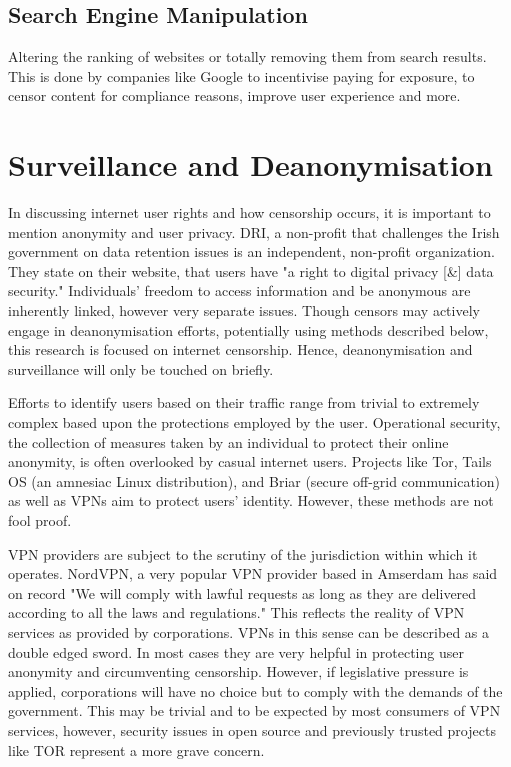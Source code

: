 \subsection{Search Engine Manipulation}

Altering the ranking of websites or totally removing them from search results. This is done by companies like Google to incentivise paying for exposure, to censor content for compliance reasons, improve user experience and more. 


\section{Surveillance and Deanonymisation}

In discussing internet user rights and how censorship occurs, it is important to mention anonymity and user privacy. DRI, a non-profit that challenges the Irish government on data retention issues is an independent, non-profit organization. They state on their website, that users have "a right to digital privacy [\&] data security." \cite{digital_rights_ireland} Individuals' freedom to access information and be anonymous are inherently linked, however very separate issues. Though censors may actively engage in deanonymisation efforts, potentially using methods described below, this research is focused on internet censorship. Hence, deanonymisation and surveillance will only be touched on briefly.

Efforts to identify users based on their traffic range from trivial to extremely complex based upon the protections employed by the user. Operational security, the collection of measures taken by an individual to protect their online anonymity, is often overlooked by casual internet users. Projects like Tor, Tails OS (an amnesiac Linux distribution), and Briar (secure off-grid communication) as well as VPNs aim to protect users’ identity. However, these methods are not fool proof. 

VPN providers are subject to the scrutiny of the jurisdiction within which it operates. NordVPN, a very popular VPN provider based in Amserdam has said on record "We will comply with lawful requests as long as they are delivered according to all the laws and regulations." This reflects the reality of VPN services as provided by corporations. VPNs in this sense can be described as a double edged sword. In most cases they are very helpful in protecting user anonymity and circumventing censorship. However, if legislative pressure is applied, corporations will have no choice but to comply with the demands of the government. This may be trivial and to be expected by most consumers of VPN services, however, security issues in open source and previously trusted projects like TOR represent a more grave concern. 

